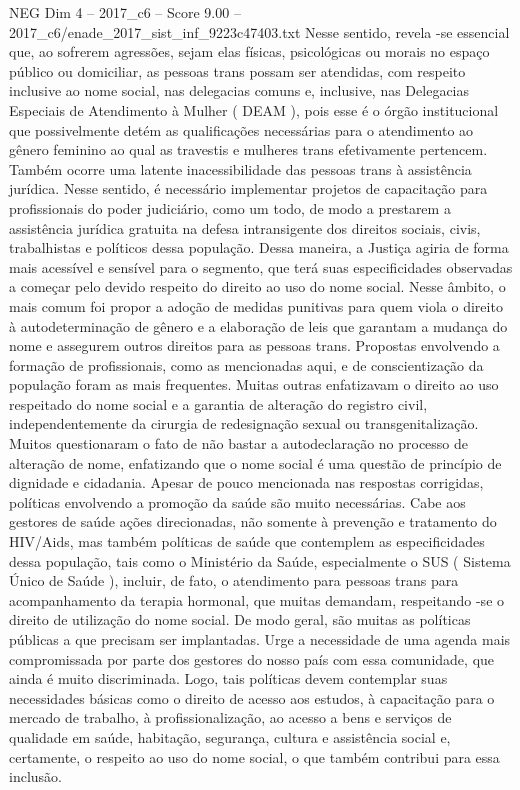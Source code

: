 \begin{textsample}{NEG Dim 4 – 2017\_c6 – Score 9.00 – 2017\_c6/enade\_2017\_sist\_inf\_9223c47403.txt}
Nesse sentido, revela -se essencial que, ao sofrerem agressões, sejam elas físicas, psicológicas ou morais no espaço público ou domiciliar, as pessoas trans possam ser atendidas, com respeito inclusive ao nome social, nas delegacias comuns e, inclusive, nas Delegacias Especiais de Atendimento à Mulher ( DEAM ), pois esse é o órgão institucional que possivelmente detém as qualificações necessárias para o atendimento ao gênero feminino ao qual as travestis e mulheres trans efetivamente pertencem.
Também ocorre uma latente inacessibilidade das pessoas trans à assistência jurídica.
Nesse sentido, é necessário implementar projetos de capacitação para profissionais do poder judiciário, como um todo, de modo a prestarem a assistência jurídica gratuita na defesa intransigente dos direitos sociais, civis, trabalhistas e políticos dessa população.
Dessa maneira, a Justiça agiria de forma mais acessível e sensível para o segmento, que terá suas especificidades observadas a começar pelo devido respeito do direito ao uso do nome social.
Nesse âmbito, o mais comum foi propor a adoção de medidas punitivas para quem viola o direito à autodeterminação de gênero e a elaboração de leis que garantam a mudança do nome e assegurem outros direitos para as pessoas trans.
Propostas envolvendo a formação de profissionais, como as mencionadas aqui, e de conscientização da população foram as mais frequentes.
Muitas outras enfatizavam o direito ao uso respeitado do nome social e a garantia de alteração do registro civil, independentemente da cirurgia de redesignação sexual ou transgenitalização.
Muitos questionaram o fato de não bastar a autodeclaração no processo de alteração de nome, enfatizando que o nome social é uma questão de princípio de dignidade e cidadania.
Apesar de pouco mencionada nas respostas corrigidas, políticas envolvendo a promoção da saúde são muito necessárias.
Cabe aos gestores de saúde ações direcionadas, não somente à prevenção e tratamento do HIV/Aids, mas também políticas de saúde que contemplem as especificidades dessa população, tais como o Ministério da Saúde, especialmente o SUS ( Sistema Único de Saúde ), incluir, de fato, o atendimento para pessoas trans para acompanhamento da terapia hormonal, que muitas demandam, respeitando -se o direito de utilização do nome social.
De modo geral, são muitas as políticas públicas a que precisam ser implantadas.
Urge a necessidade de uma agenda mais compromissada por parte dos gestores do nosso país com essa comunidade, que ainda é muito discriminada.
Logo, tais políticas devem contemplar suas necessidades básicas como o direito de acesso aos estudos, à capacitação para o mercado de trabalho, à profissionalização, ao acesso a bens e serviços de qualidade em saúde, habitação, segurança, cultura e assistência social e, certamente, o respeito ao uso do nome social, o que também contribui para essa inclusão.

\end{textsample}
